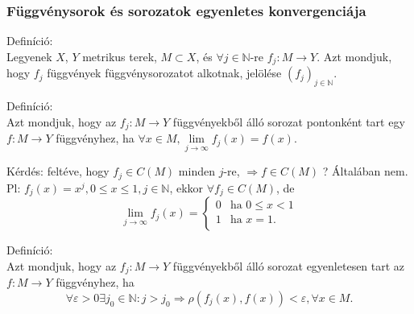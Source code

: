 \documentclass[12pt,a4paper]{scrartcl}
\newenvironment{definicio}{}{}
\begin{document}
\hypertarget{fuggvenysorok-es-sorozatok-egyenletes-konvergenciaja}{%
\subsubsection{Függvénysorok és sorozatok egyenletes
konvergenciája}\label{fuggvenysorok-es-sorozatok-egyenletes-konvergenciaja}}

\begin{definicio}

Definíció:\\
Legyenek \(X\), \(Y\) metrikus terek, \(M \subset X\), és
\(\forall j \in {\mathbb{N}}\)-re
\(\left. f_{j}:M\rightarrow Y \right.\). Azt mondjuk, hogy \(f_{j}\)
függvények függvénysorozatot alkotnak, jelölése
\(\left( f_{j} \right)_{j \in {\mathbb{N}}}\).

\end{definicio}

\begin{definicio}

Definíció:\\
Azt mondjuk, hogy az \(\left. f_{j}:M\rightarrow Y \right.\)
függvényekből álló sorozat pontonként tart egy
\(\left. f:M\rightarrow Y \right.\) függvényhez, ha
\(\forall x \in M,\underset{j\rightarrow\infty}{\lim}f_{j}\left( x \right) = f\left( x \right)\).

\end{definicio}

Kérdés: feltéve, hogy \(f_{j} \in C\left( M \right)\) minden \(j\)-re,
\(\left. \Rightarrow f \in C\left( M \right) \right.\) ? Általában nem.
Pl:
\(f_{j}\left( x \right) = x^{j},0 \leq x \leq 1,j \in {\mathbb{N}}\),
ekkor \(\forall f_{j} \in C\left( M \right)\), de
\[\underset{j\rightarrow\infty}{\lim}f_{j}\left( x \right) = \begin{cases}
0 & {\text{ha~}0 \leq x < 1} \\
1 & {\text{ha~}x = 1.} \\
\end{cases}\]

\begin{definicio}

Definíció:\\
Azt mondjuk, hogy az \(\left. f_{j}:M\rightarrow Y \right.\)
függvényekből álló sorozat egyenletesen tart az
\(\left. f:M\rightarrow Y \right.\) függvényhez, ha
\[\left. \forall\varepsilon > 0\exists j_{0} \in {\mathbb{N}}:j > j_{0}\Rightarrow\rho\left( {f_{j}\left( x \right),f\left( x \right)} \right) < \varepsilon,\forall x \in M. \right.\]

\end{definicio}
\end{document}
